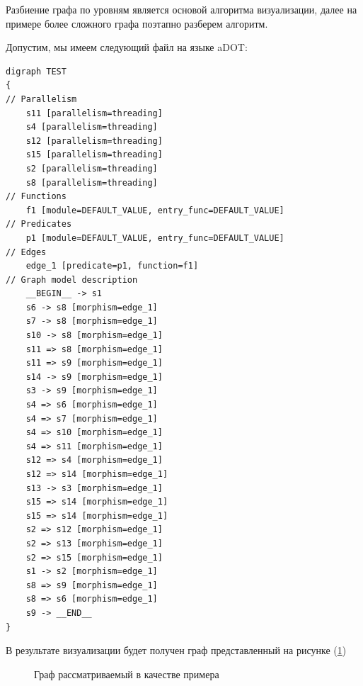 Разбиение графа по уровням является основой алгоритма визуализации, далее на примере более сложного графа поэтапно разберем алгоритм.

Допустим, мы имеем следующий файл на языке aDOT:

\begin{verbatim}
digraph TEST
{
// Parallelism
	s11 [parallelism=threading]
	s4 [parallelism=threading]
	s12 [parallelism=threading]
	s15 [parallelism=threading]
	s2 [parallelism=threading]
	s8 [parallelism=threading]
// Functions
	f1 [module=DEFAULT_VALUE, entry_func=DEFAULT_VALUE]
// Predicates
	p1 [module=DEFAULT_VALUE, entry_func=DEFAULT_VALUE]
// Edges
	edge_1 [predicate=p1, function=f1]
// Graph model description
	__BEGIN__ -> s1
	s6 -> s8 [morphism=edge_1]
	s7 -> s8 [morphism=edge_1]
	s10 -> s8 [morphism=edge_1]
	s11 => s8 [morphism=edge_1]
	s11 => s9 [morphism=edge_1]
	s14 -> s9 [morphism=edge_1]
	s3 -> s9 [morphism=edge_1]
	s4 => s6 [morphism=edge_1]
	s4 => s7 [morphism=edge_1]
	s4 => s10 [morphism=edge_1]
	s4 => s11 [morphism=edge_1]
	s12 => s4 [morphism=edge_1]
	s12 => s14 [morphism=edge_1]
	s13 -> s3 [morphism=edge_1]
	s15 => s14 [morphism=edge_1]
	s15 => s14 [morphism=edge_1]
	s2 => s12 [morphism=edge_1]
	s2 => s13 [morphism=edge_1]
	s2 => s15 [morphism=edge_1]
	s1 -> s2 [morphism=edge_1]
	s8 => s9 [morphism=edge_1]
	s8 => s6 [morphism=edge_1]
	s9 -> __END__ 
}
\end{verbatim}

В результате визуализации будет получен граф представленный на рисунке (\ref{fig:main_graph})

\begin{figure}[h!]
\caption{Граф рассматриваемый в качестве примера}
\label{fig:main_graph}
\end{figure}

